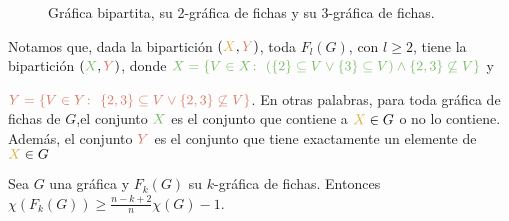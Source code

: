 \begin{figure}[ht!]
    \caption{Gr\'afica bipartita, su 2-gr\'afica de fichas y su 3-gr\'afica de fichas.}
    \label{fig:ex-bip}
\end{figure}

Notamos que, dada la bipartici\'on
$({\color{amarilloOscuro}X},{\color{salmon}Y})$, toda $F_l(G)$, con $l\geq 2$,
tiene la bipartici\'on $({\color{verde}X},{\color{salmon}Y})$, donde
${\color{verde}X=\{V\in X\colon\ (\{2\}\subseteq V  \lor \{3\} \subseteq V)
\land \{2,3\}\not\subseteq V\}}$ y 

${\color{salmon}Y=\{V \in Y\colon\ \{2,3\}\subseteq V \lor \{2,3\}\not\subseteq
V\}}$. En otras palabras, para toda gr\'afica de fichas de $G$,el conjunto
${\color{verde}X}$ es el conjunto que contiene a
${\color{amarilloOscuro}X}\in G$ o no lo contiene. Adem\'as, el conjunto
${\color{salmon}Y}$ es el conjunto que tiene exactamente un elemente de
${\color{amarilloOscuro}X}\in G$    

    \begin{teorema}
        \label{relacion num cromatico G y F(G) con k}
            Sea $G$ una gr\'afica y $F_k(G)$ su $k$-gr\'afica de fichas.
            Entonces $\chi(F_k(G)) \geq \frac{n-k+2}{n} \chi(G) -1$.
        \end{teorema}
        
